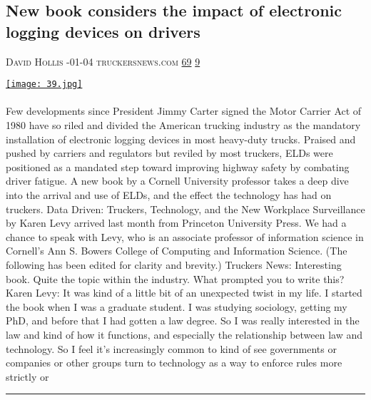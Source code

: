 \documentclass[10pt,a4paper]{article}
\begin{document}
\begin{multicols}{2}
\begin{minipage}{\linewidth}
\subsection{New book considers the impact of electronic logging devices on drivers}
\textsc{\footnotesize
{\scriptsize\faUser}\space 
David Hollis 
{\scriptsize\faCalendar}-01-04 
{\scriptsize\faGlobe}\space 
truckersnews.com 
{\scriptsize\faThumbsOUp}\space 
\href{http://news.ycombinator.com/item?id=37143716\&utm\_term=comment}{69} 
{\scriptsize\faComments}\space 
\href{http://news.ycombinator.com/item?id=37143716\&utm\_term=comment}{9} 
}
\par\medskip\noindent
\href{https://www.truckersnews.com/home/article/15305066/new-book-considers-the-impact-of-electronic-logging-devices-on-drivers?utm\_source=hackernewsletter\&utm\_medium=email\&utm\_term=books}{
    \texttt{[image: 39.jpg]}
}
\end{minipage}
\paragraph{}
Few developments since President Jimmy Carter signed the Motor Carrier Act of 1980 have so riled and divided the American trucking industry as the mandatory installation of electronic logging devices in most heavy-duty trucks. Praised and pushed by carriers and regulators but reviled by most truckers, ELDs were positioned as a mandated step toward improving highway safety by combating driver fatigue.
A new book by a Cornell University professor takes a deep dive into the arrival and use of ELDs, and the effect the technology has had on truckers. Data Driven: Truckers, Technology, and the New Workplace Surveillance by Karen Levy arrived last month from Princeton University Press.
We had a chance to speak with Levy, who is an associate professor of information science in Cornell's Ann S. Bowers College of Computing and Information Science. (The following has been edited for clarity and brevity.)
Truckers News: Interesting book. Quite the topic within the industry. What prompted you to write this?
Karen Levy: It was kind of a little bit of an unexpected twist in my life. I started the book when I was a graduate student. I was studying sociology, getting my PhD, and before that I had gotten a law degree. So I was really interested in the law and kind of how it functions, and especially the relationship between law and technology. So I feel it's increasingly common to kind of see governments or companies or other groups turn to technology as a way to enforce rules more strictly or
\par\noindent\textcolor{red}{\rule{\linewidth}{0.2mm}}
\vfill
\null
\noindent\begin{minipage}{\linewidth}

\end{minipage}
\end{multicols}
\end{document}
